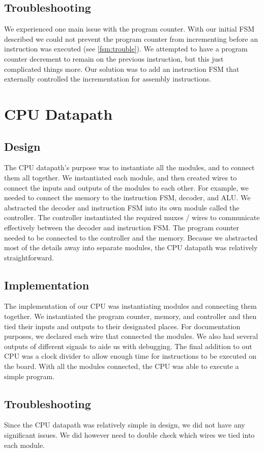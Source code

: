 \documentclass[11pt]{article}
\begin{document}
\subsection{Troubleshooting}
We experienced one main issue with the program counter. With our initial FSM described  we could not prevent the program counter from incrementing before an instruction was executed (see \ref{fsm:trouble}). We attempted to have a program counter decrement to remain on the previous instruction, but this just complicated things more. Our solution was to add an instruction FSM that externally controlled the incrementation for assembly instructions. 

\section{CPU Datapath}
\subsection{Design}
The CPU datapath’s purpose was to instantiate all the modules, and to connect them all together. We instantiated each module, and then created wires to connect the inputs and outputs of the modules to each other. For example, we needed to connect the memory to the instruction FSM, decoder, and ALU. We abstracted the decoder and instruction FSM into its own module called the controller. The controller instantiated the required muxes / wires to communicate effectively between the decoder and instruction FSM.  The program counter needed to be connected to the controller and the memory. Because we abstracted most of the details away into separate modules, the CPU datapath was relatively straightforward. 

\subsection{Implementation}
The implementation of our CPU was instantiating modules and connecting them together. We instantiated the program counter, memory, and controller and then tied their inputs and outputs to their designated places. For documentation purposes, we declared each wire that connected the modules. We also had several outputs of different signals to aide us with debugging. The final addition to out CPU was a clock divider to allow enough time for instructions to be executed on the board. With all the modules connected, the CPU was able to execute a simple program.


\subsection{Troubleshooting}
Since the CPU datapath was relatively simple in design, we did not have any significant issues. We did however need to double check which wires we tied into each module. 
\end{document}
